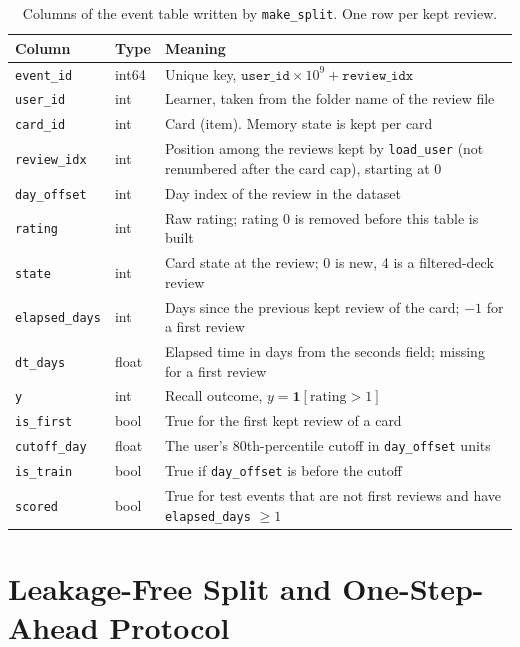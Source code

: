 \begin{table}[htbp]
  \centering
  \footnotesize\setlength{\tabcolsep}{4pt}
  \caption{Columns of the event table written by \texttt{make\_split}. One row per kept review.}
  \label{tab:events}
  \footnotesize
  \begin{tabular}{@{}p{2.8cm}p{1.8cm}p{9.6cm}@{}}
    \toprule
    Column & Type & Meaning \\
    \midrule
    \texttt{event\_id} & int64 & Unique key, $\texttt{user\_id} \times 10^9 + \texttt{review\_idx}$ \\
    \texttt{user\_id} & int & Learner, taken from the folder name of the review file \\
    \texttt{card\_id} & int & Card (item). Memory state is kept per card \\
    \texttt{review\_idx} & int & Position among the reviews kept by \texttt{load\_user} (not renumbered after the card cap), starting at 0 \\
    \texttt{day\_offset} & int & Day index of the review in the dataset \\
    \texttt{rating} & int & Raw rating; rating 0 is removed before this table is built \\
    \texttt{state} & int & Card state at the review; 0 is new, 4 is a filtered-deck review \\
    \texttt{elapsed\_days} & int & Days since the previous kept review of the card; $-1$ for a first review \\
    \texttt{dt\_days} & float & Elapsed time in days from the seconds field; missing for a first review \\
    \texttt{y} & int & Recall outcome, $y = \mathbf{1}[\text{rating} > 1]$ \\
    \texttt{is\_first} & bool & True for the first kept review of a card \\
    \texttt{cutoff\_day} & float & The user's 80th-percentile cutoff in \texttt{day\_offset} units \\
    \texttt{is\_train} & bool & True if \texttt{day\_offset} is before the cutoff \\
    \texttt{scored} & bool & True for test events that are not first reviews and have \texttt{elapsed\_days} $\ge 1$ \\
    \bottomrule
  \end{tabular}
\end{table}

\section{Leakage-Free Split and One-Step-Ahead Protocol}
\label{sec:design-split}

